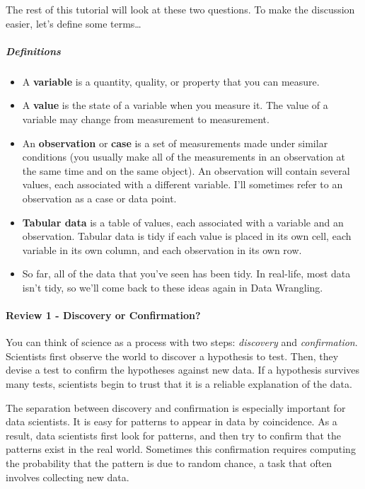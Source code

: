 \documentclass[
]{article}
\providecommand{\tightlist}{%
  \setlength{\itemsep}{0pt}\setlength{\parskip}{0pt}}
\begin{document}
The rest of this tutorial will look at these two questions. To make the
discussion easier, let's define some terms\ldots{}

\hypertarget{definitions}{%
\subparagraph{Definitions}\label{definitions}}

\begin{itemize}
\tightlist
\item
  A \textbf{variable} is a quantity, quality, or property that you can
  measure.
\item
  A \textbf{value} is the state of a variable when you measure it. The
  value of a variable may change from measurement to measurement.
\item
  An \textbf{observation} or \textbf{case} is a set of measurements made
  under similar conditions (you usually make all of the measurements in
  an observation at the same time and on the same object). An
  observation will contain several values, each associated with a
  different variable. I'll sometimes refer to an observation as a case
  or data point.
\item
  \textbf{Tabular data} is a table of values, each associated with a
  variable and an observation. Tabular data is tidy if each value is
  placed in its own cell, each variable in its own column, and each
  observation in its own row.
\item
  So far, all of the data that you've seen has been tidy. In real-life,
  most data isn't tidy, so we'll come back to these ideas again in Data
  Wrangling.
\end{itemize}

\hypertarget{review-1---discovery-or-confirmation}{%
\paragraph{Review 1 - Discovery or
Confirmation?}\label{review-1---discovery-or-confirmation}}

You can think of science as a process with two steps: \emph{discovery}
and \emph{confirmation}. Scientists first observe the world to discover
a hypothesis to test. Then, they devise a test to confirm the hypotheses
against new data. If a hypothesis survives many tests, scientists begin
to trust that it is a reliable explanation of the data.

The separation between discovery and confirmation is especially
important for data scientists. It is easy for patterns to appear in data
by coincidence. As a result, data scientists first look for patterns,
and then try to confirm that the patterns exist in the real world.
Sometimes this confirmation requires computing the probability that the
pattern is due to random chance, a task that often involves collecting
new data.
\end{document}
